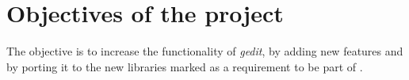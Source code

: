 
\chapter{Objectives of the project}


The objective is to increase the functionality of \emph{gedit}, by adding new features and by porting it to the new libraries marked as a requirement to be part of .



